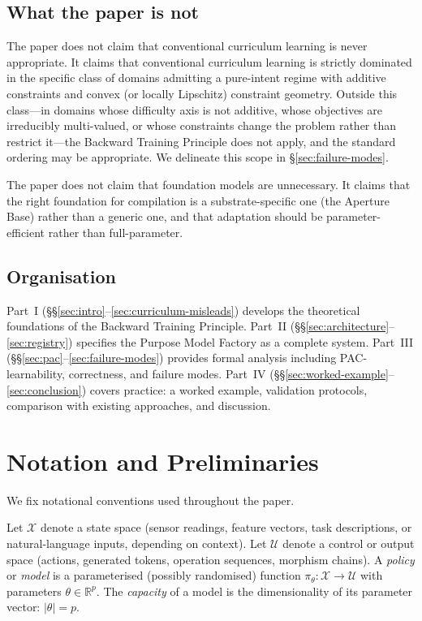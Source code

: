 \documentclass[twocolumn,11pt,a4paper]{article}
\newcommand{\cU}{\mathcal{U}}
\newcommand{\cX}{\mathcal{X}}
\newcommand{\R}{\mathbb{R}}
\begin{document}
\subsection{What the paper is not}
\label{sec:what-not}

The paper does not claim that conventional curriculum learning is never appropriate. It claims that conventional curriculum learning is strictly dominated in the specific class of domains admitting a pure-intent regime with additive constraints and convex (or locally Lipschitz) constraint geometry. Outside this class---in domains whose difficulty axis is not additive, whose objectives are irreducibly multi-valued, or whose constraints change the problem rather than restrict it---the Backward Training Principle does not apply, and the standard ordering may be appropriate. We delineate this scope in \S\ref{sec:failure-modes}.

The paper does not claim that foundation models are unnecessary. It claims that the right foundation for compilation is a substrate-specific one (the Aperture Base) rather than a generic one, and that adaptation should be parameter-efficient rather than full-parameter.

\subsection{Organisation}

Part~I (\S\S\ref{sec:intro}--\ref{sec:curriculum-misleads}) develops the theoretical foundations of the Backward Training Principle. Part~II (\S\S\ref{sec:architecture}--\ref{sec:registry}) specifies the Purpose Model Factory as a complete system. Part~III (\S\S\ref{sec:pac}--\ref{sec:failure-modes}) provides formal analysis including PAC-learnability, correctness, and failure modes. Part~IV (\S\S\ref{sec:worked-example}--\ref{sec:conclusion}) covers practice: a worked example, validation protocols, comparison with existing approaches, and discussion.


\section{Notation and Preliminaries}
\label{sec:notation}

We fix notational conventions used throughout the paper.

Let $\cX$ denote a state space (sensor readings, feature vectors, task descriptions, or natural-language inputs, depending on context). Let $\cU$ denote a control or output space (actions, generated tokens, operation sequences, morphism chains). A \emph{policy} or \emph{model} is a parameterised (possibly randomised) function $\pi_\theta: \cX \to \cU$ with parameters $\theta \in \R^p$. The \emph{capacity} of a model is the dimensionality of its parameter vector: $|\theta| = p$.
\end{document}
